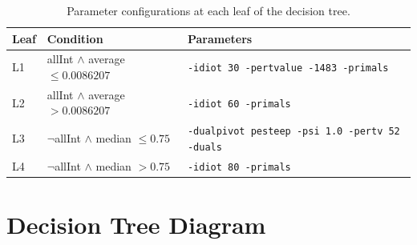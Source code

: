 \documentclass[11pt,a4paper]{article}
\begin{document}
\begin{table}[htbp]
\centering
\caption{Parameter configurations at each leaf of the decision tree.}
\label{tab:leaves}
\begin{tabular}{@{}llp{8cm}@{}}
\toprule
\textbf{Leaf} & \textbf{Condition} & \textbf{Parameters} \\
\midrule
L1 & allInt $\wedge$ average $\leq 0.0086207$
   & \texttt{-idiot 30 -pertvalue -1483 -primals} \\
L2 & allInt $\wedge$ average $> 0.0086207$
   & \texttt{-idiot 60 -primals} \\
L3 & $\neg$allInt $\wedge$ median $\leq 0.75$
   & \texttt{-dualpivot pesteep -psi 1.0 -pertv 52 -duals} \\
L4 & $\neg$allInt $\wedge$ median $> 0.75$
   & \texttt{-idiot 80 -primals} \\
\bottomrule
\end{tabular}
\end{table}

\section{Decision Tree Diagram}
\end{document}
